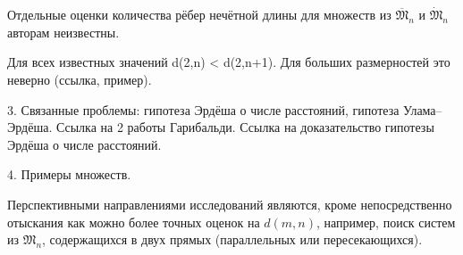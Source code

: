 Отдельные оценки количества рёбер нечётной длины для множеств из $\overline{\mathfrak{M}}_n$ и $\dot{\mathfrak{M}}_n$
авторам неизвестны.



Для всех известных значений d(2,n) < d(2,n+1).
Для больших размерностей это неверно (ссылка, пример).


3. Связанные проблемы: гипотеза Эрдёша о числе расстояний, гипотеза Улама--Эрдёша.
Ссылка на 2 работы Гарибальди. Ссылка на доказательство гипотезы Эрдёша о числе расстояний.

4. Примеры множеств.



Перспективными направлениями исследований являются, кроме непосредственно отыскания как можно более точных оценок на $d(m,n)$,
например, поиск систем из $\mathfrak{M}_n$, содержащихся в двух прямых (параллельных или пересекающихся).
